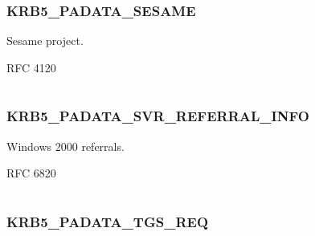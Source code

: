 \documentclass[letterpaper,10pt,english]{sphinxmanual}
\begin{document}
\subsubsection{KRB5\_PADATA\_SESAME}
\label{appdev/refs/macros/KRB5_PADATA_SESAME::doc}\label{appdev/refs/macros/KRB5_PADATA_SESAME:krb5-padata-sesame}\label{appdev/refs/macros/KRB5_PADATA_SESAME:krb5-padata-sesame-data}

\begin{fulllineitems}
\label{appdev/refs/macros/KRB5_PADATA_SESAME:KRB5_PADATA_SESAME}
\end{fulllineitems}


Sesame project.

RFC 4120

\begin{tabulary}{\linewidth}{|L|L|}
\hline

 & 
\\
\hline\end{tabulary}



\subsubsection{KRB5\_PADATA\_SVR\_REFERRAL\_INFO}
\label{appdev/refs/macros/KRB5_PADATA_SVR_REFERRAL_INFO::doc}\label{appdev/refs/macros/KRB5_PADATA_SVR_REFERRAL_INFO:krb5-padata-svr-referral-info}\label{appdev/refs/macros/KRB5_PADATA_SVR_REFERRAL_INFO:krb5-padata-svr-referral-info-data}

\begin{fulllineitems}
\label{appdev/refs/macros/KRB5_PADATA_SVR_REFERRAL_INFO:KRB5_PADATA_SVR_REFERRAL_INFO}
\end{fulllineitems}


Windows 2000 referrals.

RFC 6820

\begin{tabulary}{\linewidth}{|L|L|}
\hline

 & 
\\
\hline\end{tabulary}



\subsubsection{KRB5\_PADATA\_TGS\_REQ}
\label{appdev/refs/macros/KRB5_PADATA_TGS_REQ::doc}\label{appdev/refs/macros/KRB5_PADATA_TGS_REQ:krb5-padata-tgs-req}\label{appdev/refs/macros/KRB5_PADATA_TGS_REQ:krb5-padata-tgs-req-data}
\end{document}
